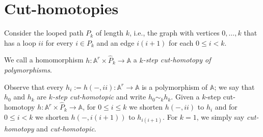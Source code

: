 \documentclass[oneside]{amsart}
\newcommand{\str}[1]{\mathbb{#1}}
\begin{document}
\section{Cut-homotopies}\label{section:cut_homotopies}

Consider the looped path $P_k$ of length $k$, i.e., the graph with vertices $0,\dots,k$ that has a loop $ii$ for every $i\in P_k$ and an edge $i(i+1)$ for each $0\leq i < k$.

\begin{definition}
We call a homomorphism $h\colon \str A^r \times \hat P_k\to \str A$ a $k$\emph{-step cut-homotopy of polymorphisms}. 
\end{definition}

Observe that every $h_{i}:= h(-,ii)\colon \str A^r\to\str A$ is a polymorphism of $\str A$; we say that $h_0$ and $h_k$ are $k$\emph{-step cut-homotopic} and write $h_{0}\sim_k h_{k}$.
Given a $k$-step cut-homotopy $h\colon \str A^r \times \hat P_k\to \str A$, for $0\leq i\leq k$ we shorten $h(-,ii)$ to $h_i$ and for $0\leq i < k$ we shorten $h(-,i(i+1))$ to $h_{i(i+1)}$. 
For $k=1$, we simply say \emph{cut-homotopy} and \emph{cut-homotopic}.
\end{document}
